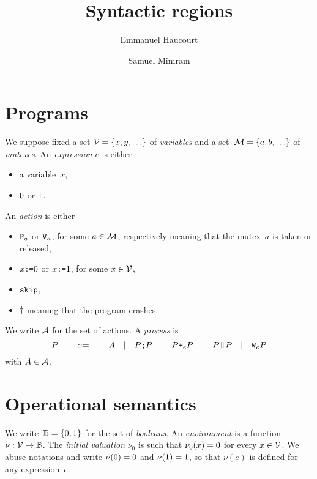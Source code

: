 \documentclass[a4paper]{article}
\title{Syntactic regions}
\author{Emmanuel Haucourt \and Samuel Mimram}
\theoremstyle{theorem}
\theoremstyle{remark}
\begin{document}
\maketitle

\section{Programs}
We suppose fixed a set $\variables=\set{x,y,\ldots}$ of \emph{variables} and a
set~$\mutexes=\set{a,b,\ldots}$ of \emph{mutexes}. An \emph{expression} $e$ is either
\begin{itemize}
\item a variable~$x$,
\item $\Bfalse$ or $\Btrue$.
\end{itemize}
An \emph{action} is either
\begin{itemize}
\item $\P a$ or $\V a$, for some $a\in\mutexes$, respectively meaning that the
  mutex~$a$ is taken or released,
\item $\pset x\Bfalse$ or $\pset x\Btrue$, for some $x\in\variables$,
\item $\pskip$,
\item $\pdie$ meaning that the program crashes.
\end{itemize}
We write $\actions$ for the set of actions. A \emph{process} is
\[
  P
  \qquad::=\qquad
  A
  \quad|\quad
  \pseq PP
  \quad|\quad
  \por ePP
  \quad|\quad
  \ppar PP
  \quad|\quad
  \ploop eP
\]
with $A\in\actions$.

\section{Operational semantics}
We write~$\B=\set{\Bfalse,\Btrue}$ for the set of \emph{booleans}. An
\emph{environment} is a function $\nu:\variables\to\B$. The \emph{initial
  valuation} $\nu_0$ is such that $\nu_0(x)=\Bfalse$ for every
$x\in\variables$. We abuse notations and write $\nu(\Bfalse)=\Bfalse$ and
$\nu(\Btrue)=\Btrue$, so that $\nu(e)$ is defined for any expression~$e$.
\end{document}
